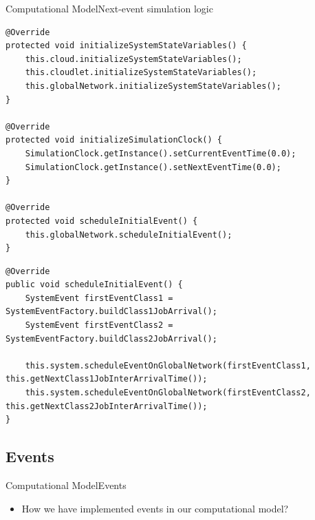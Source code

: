 \documentclass[10pt]{beamer}
\begin{document}
\begin{frame}[fragile]{Computational Model}{Next-event simulation logic}


\begin{lstlisting}[frame=lines, caption={\texttt{System} class methods}]
@Override
protected void initializeSystemStateVariables() {
    this.cloud.initializeSystemStateVariables();
    this.cloudlet.initializeSystemStateVariables();
    this.globalNetwork.initializeSystemStateVariables();
}

@Override
protected void initializeSimulationClock() {
    SimulationClock.getInstance().setCurrentEventTime(0.0);
    SimulationClock.getInstance().setNextEventTime(0.0);
}

@Override
protected void scheduleInitialEvent() {
    this.globalNetwork.scheduleInitialEvent();
}
\end{lstlisting}

\begin{lstlisting}[frame=lines, caption={\texttt{GlobalNetwork.scheduleInitialEvent} method}]
@Override
public void scheduleInitialEvent() {
    SystemEvent firstEventClass1 = SystemEventFactory.buildClass1JobArrival();
    SystemEvent firstEventClass2 = SystemEventFactory.buildClass2JobArrival();

    this.system.scheduleEventOnGlobalNetwork(firstEventClass1, this.getNextClass1JobInterArrivalTime());
    this.system.scheduleEventOnGlobalNetwork(firstEventClass2, this.getNextClass2JobInterArrivalTime());
}
\end{lstlisting}
\end{frame}



\subsection{Events}
\begin{frame}{Computational Model}{Events}

\begin{itemize}
\item How we have implemented events in our computational model?
\end{itemize}
\end{frame}


\end{document}
